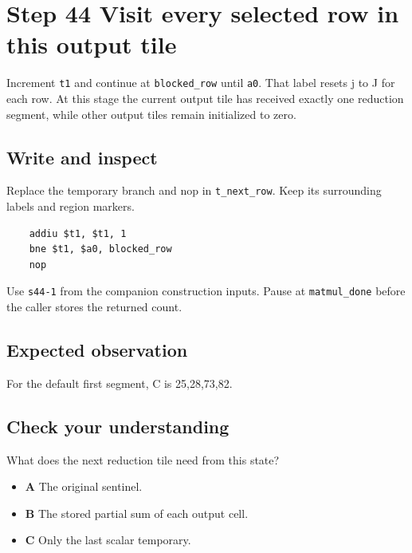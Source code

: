 \section{Step 44 Visit every selected row in this output tile}\label{matmul-s44}

Increment \texttt{t1} and continue at \texttt{blocked\_row} until \texttt{a0}. That label resets j to J for each row. At this stage the current output tile has received exactly one reduction segment, while other output tiles remain initialized to zero.

\subsection{Write and inspect}
Replace the temporary branch and nop in \texttt{t\_next\_row}. Keep its surrounding labels and region markers.

\begin{verbatim}
    addiu $t1, $t1, 1
    bne $t1, $a0, blocked_row
    nop
\end{verbatim}
Use \texttt{s44-1} from the companion construction inputs. Pause at \texttt{matmul\_done} before the caller stores the returned count.

\subsection{Expected observation}
For the default first segment, C is 25,28,73,82.

\subsection{Check your understanding}
What does the next reduction tile need from this state?

\begin{itemize}
  \item \textbf{A} The original sentinel.
  \item \textbf{B} The stored partial sum of each output cell.
  \item \textbf{C} Only the last scalar temporary.
\end{itemize}
